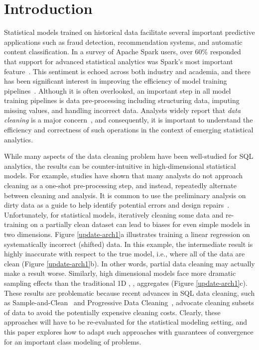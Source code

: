 \section{Introduction}
Statistical models trained on historical data facilitate several important predictive applications such as fraud detection, recommendation systems, and automatic content classification.
In a survey of Apache Spark users, over 60\% responded that support for advanced statistical analytics was Spark's most important feature~\cite{sparksurvey}.
This sentiment is echoed across both industry and academia, and there has been significant interest in improving the efficiency of model training pipelines~\cite{bdas, alexandrov2014stratosphere, crotty2014tupleware, tensor}. 
Although it is often overlooked, an important step in all model training pipelines is data pre-processing including structuring data, imputing missing values, and handling incorrect data.
Analysts widely report that \emph{data cleaning} is a major concern~\cite{kandel2012,nytimes}, and consequently, it is important to understand the efficiency and correctness of such operations in the context of emerging statistical analytics.

While many aspects of the data cleaning problem have been well-studied for SQL analytics, the results can be counter-intuitive in high-dimensional statistical models.
For example, studies have shown that many analysts do not approach cleaning as a one-shot pre-processing step, and instead, repeatedly alternate between cleaning and analysis.
It is common to use the preliminary analysis on dirty data as a guide to help identify potential errors and design repairs~\cite{kandel2012}.
Unfortunately, for statistical models, iteratively cleaning some data and re-training on a partially clean dataset can lead to biases for even simple models in two dimensions.
Figure \ref{update-arch1}a illustrates training a linear regression on systematically incorrect (shifted) data.
In this example, the intermediate result is highly inaccurate with respect to the true model, i.e., where all of the data are clean (Figure \ref{update-arch1}b).
In other words, partial data cleaning may actually make a result worse.
Similarly, high dimensional models face more dramatic sampling effects than the traditional 1D  \sumfunc, \countfunc, \avgfunc aggregates (Figure \ref{update-arch1}c).
These results are problematic because recent advances in SQL data cleaning, such as Sample-and-Clean~\cite{wang1999sample} and Progressive Data Cleaning~\cite{altowim2014progressive, papenbrock2015progressive, DBLP:journals/pvldb/YakoutENOI11}, advocate cleaning subsets of data to avoid the potentially expensive cleaning costs.
Clearly, these approaches will have to be re-evaluated for the statistical modeling setting, and this paper explores how to adapt such approaches with guarantees of convergence for an important class modeling of problems. 

